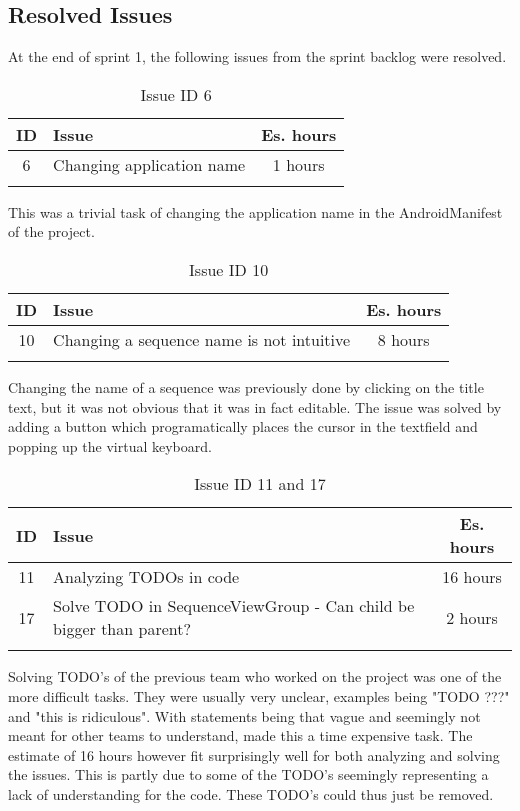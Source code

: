\subsection{Resolved Issues} \label{subsec:spr1_resolved_issues}

At the end of sprint 1, the following issues from the sprint backlog were resolved.
\begin{longtable} { | c | p{12cm} | c | } 
\hline
	ID 	&	Issue	&		 Es. hours \\\hline
	6	& 	Changing application name	&	1 hours	\\\hline
\caption{Issue ID 6}
\label{tab:spr1_issue6}
\end{longtable}
This was a trivial task of changing the application name in the AndroidManifest of the project.

\begin{longtable} { | c | p{12cm} | c | } 
\hline
	ID 	&	Issue	&		 Es. hours \\\hline
	10	& 	Changing a sequence name is not intuitive	&	8 hours	\\\hline
\caption{Issue ID 10}
\label{tab:spr1_issue10}
\end{longtable}
Changing the name of a sequence was previously done by clicking on the title text, but it was not obvious that it was in fact editable. The issue was solved by adding a button which programatically places the cursor in the textfield and popping up the virtual keyboard.

\begin{longtable} { | c | p{12cm} | c | } 
\hline
	ID 	&	Issue	&		 Es. hours \\\hline
	11	& 	Analyzing TODOs in code	&	16 hours	\\\hline
	17	& 	Solve TODO in SequenceViewGroup - Can child be bigger than parent?	&	2 hours	\\\hline
\caption{Issue ID 11 and 17}
\label{tab:spr1_issues11_17}
\end{longtable}

Solving TODO's of the previous team who worked on the project was one of the more difficult tasks. They were usually very unclear, examples being "TODO ???" and "this is ridiculous". With statements being that vague and seemingly not meant for other teams to understand, made this a time expensive task. The estimate of 16 hours however fit surprisingly well for both analyzing and solving the issues. This is partly due to some of the TODO's seemingly representing a lack of understanding for the code. These TODO's could thus just be removed.

